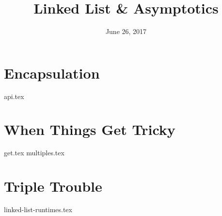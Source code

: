 \documentclass{exam}
\title{Linked List \& Asymptotics}
\date{June 26, 2017}
\begin{document}
\maketitle

\section{Encapsulation}
{api.tex}

\section{When Things Get Tricky}
\begin{questions}
{get.tex}
\clearpage
{multiples.tex}
\end{questions}

\clearpage

\section{Triple Trouble}
\begin{questions}
{linked-list-runtimes.tex}
\end{questions}
\end{document}
